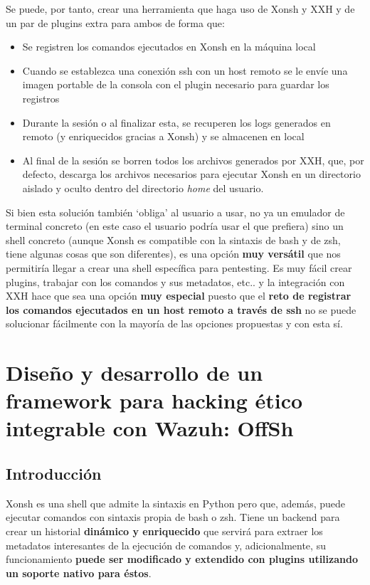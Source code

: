Se puede, por tanto, crear una herramienta que haga uso de Xonsh y XXH y de un par de plugins extra para ambos de forma que:

\begin{itemize}
    \item Se registren los comandos ejecutados en Xonsh en la máquina local
    \item Cuando se establezca una conexión ssh con un host remoto se le envíe una imagen portable de la consola con el plugin necesario para guardar los registros
    \item Durante la sesión o al finalizar esta, se recuperen los logs generados en remoto (y enriquecidos gracias a Xonsh) y se almacenen en local
    \item Al final de la sesión se borren todos los archivos generados por XXH, que, por defecto, descarga los archivos necesarios para ejecutar Xonsh en un directorio aislado y oculto dentro del directorio \textit{home} del usuario.
\end{itemize}

Si bien esta solución también `obliga' al usuario a usar, no ya un emulador de terminal concreto (en este caso el usuario podría usar el que prefiera) sino un shell concreto (aunque Xonsh es compatible con la sintaxis de bash y de zsh, tiene algunas cosas que son diferentes), es una opción \textbf{muy versátil} que nos permitiría llegar a crear una shell específica para pentesting. Es muy fácil crear plugins, trabajar con los comandos y sus metadatos, etc.. y la integración con XXH hace que sea una opción \textbf{muy especial} puesto que el \textbf{reto de registrar los comandos ejecutados en un host remoto a través de ssh} no se puede solucionar fácilmente con la mayoría de las opciones propuestas y con esta sí.




\chapter{Diseño y desarrollo de un framework para hacking ético integrable con Wazuh: OffSh} 

\section{Introducción}

Xonsh es una shell que admite la sintaxis en Python pero que, además, puede ejecutar comandos con sintaxis propia de bash o zsh. Tiene un backend para crear un historial \textbf{dinámico y enriquecido} que servirá para extraer los metadatos interesantes de la ejecución de comandos y, adicionalmente, su funcionamiento \textbf{puede ser modificado y extendido con plugins utilizando un soporte nativo para éstos}. 

